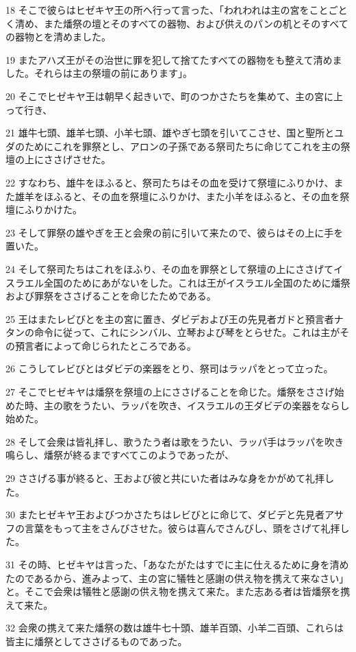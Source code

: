 \par 18 そこで彼らはヒゼキヤ王の所へ行って言った、「われわれは主の宮をことごとく清め、また燔祭の壇とそのすべての器物、および供えのパンの机とそのすべての器物とを清めました。
\par 19 またアハズ王がその治世に罪を犯して捨てたすべての器物をも整えて清めました。それらは主の祭壇の前にあります」。
\par 20 そこでヒゼキヤ王は朝早く起きいで、町のつかさたちを集めて、主の宮に上って行き、
\par 21 雄牛七頭、雄羊七頭、小羊七頭、雄やぎ七頭を引いてこさせ、国と聖所とユダのためにこれを罪祭とし、アロンの子孫である祭司たちに命じてこれを主の祭壇の上にささげさせた。
\par 22 すなわち、雄牛をほふると、祭司たちはその血を受けて祭壇にふりかけ、また雄羊をほふると、その血を祭壇にふりかけ、また小羊をほふると、その血を祭壇にふりかけた。
\par 23 そして罪祭の雄やぎを王と会衆の前に引いて来たので、彼らはその上に手を置いた。
\par 24 そして祭司たちはこれをほふり、その血を罪祭として祭壇の上にささげてイスラエル全国のためにあがないをした。これは王がイスラエル全国のために燔祭および罪祭をささげることを命じたためである。
\par 25 王はまたレビびとを主の宮に置き、ダビデおよび王の先見者ガドと預言者ナタンの命令に従って、これにシンバル、立琴および琴をとらせた。これは主がその預言者によって命じられたところである。
\par 26 こうしてレビびとはダビデの楽器をとり、祭司はラッパをとって立った。
\par 27 そこでヒゼキヤは燔祭を祭壇の上にささげることを命じた。燔祭をささげ始めた時、主の歌をうたい、ラッパを吹き、イスラエルの王ダビデの楽器をならし始めた。
\par 28 そして会衆は皆礼拝し、歌うたう者は歌をうたい、ラッパ手はラッパを吹き鳴らし、燔祭が終るまですべてこのようであったが、
\par 29 ささげる事が終ると、王および彼と共にいた者はみな身をかがめて礼拝した。
\par 30 またヒゼキヤ王およびつかさたちはレビびとに命じて、ダビデと先見者アサフの言葉をもって主をさんびさせた。彼らは喜んでさんびし、頭をさげて礼拝した。
\par 31 その時、ヒゼキヤは言った、「あなたがたはすでに主に仕えるために身を清めたのであるから、進みよって、主の宮に犠牲と感謝の供え物を携えて来なさい」と。そこで会衆は犠牲と感謝の供え物を携えて来た。また志ある者は皆燔祭を携えて来た。
\par 32 会衆の携えて来た燔祭の数は雄牛七十頭、雄羊百頭、小羊二百頭、これらは皆主に燔祭としてささげるものであった。
